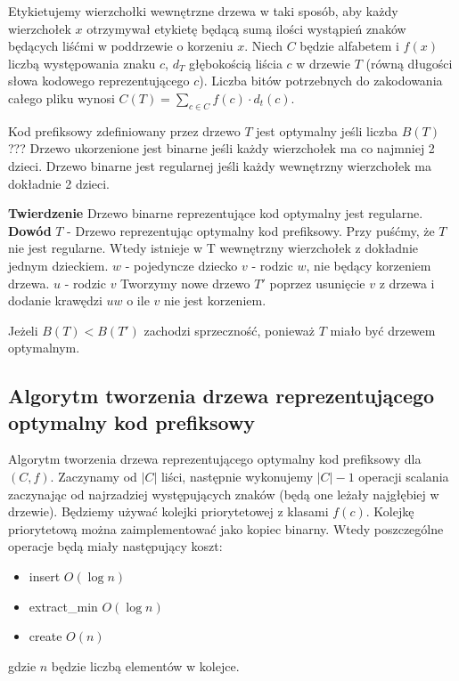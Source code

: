 
Etykietujemy wierzchołki wewnętrzne drzewa w taki sposób, aby każdy wierzchołek $x$ otrzymywał etykietę będącą sumą ilości wystąpień znaków będących liśćmi w poddrzewie o korzeniu $x$. Niech $C$ będzie alfabetem i  $f(x)$ liczbą występowania znaku $c$, $d_T$ głębokością liścia $c$ w drzewie $T$ (równą długości słowa kodowego reprezentującego $c$). Liczba bitów potrzebnych do zakodowania całego pliku wynosi $C(T) = \sum_{c \in C} f(c) \cdot d_t(c)$. 

Kod prefiksowy zdefiniowany przez drzewo $T$ jest optymalny jeśli liczba $B(T)$ ???
Drzewo ukorzenione  jest binarne jeśli każdy wierzchołek ma co najmniej 2 dzieci.
Drzewo binarne jest regularnej jeśli każdy wewnętrzny wierzchołek ma dokładnie 2 dzieci.

\textbf{Twierdzenie} Drzewo binarne reprezentujące kod optymalny jest regularne.
\textbf{Dowód} $T$ - Drzewo reprezentując optymalny kod prefiksowy. Przy puśćmy, że $T$ nie jest regularne. Wtedy istnieje w T wewnętrzny wierzchołek z dokładnie jednym dzieckiem.
$w$ - pojedyncze dziecko
$v$ - rodzic $w$, nie będący korzeniem drzewa.
$u$ - rodzic $v$
Tworzymy nowe drzewo $T'$ poprzez usunięcie $v$ z drzewa i dodanie krawędzi $uw$ o ile $v$ nie jest korzeniem.

Jeżeli $B(T) < B(T')$ zachodzi sprzeczność, ponieważ $T$ miało być drzewem optymalnym.

\subsection{Algorytm tworzenia drzewa reprezentującego optymalny kod prefiksowy}
Algorytm tworzenia drzewa reprezentującego optymalny kod prefiksowy dla $(C,f)$. 
Zaczynamy od $|C|$ liści, następnie wykonujemy $|C|-1$ operacji scalania zaczynając od najrzadziej występujących znaków (będą one leżały najgłębiej w drzewie). Będziemy używać kolejki priorytetowej z klasami $f(c)$. Kolejkę priorytetową można zaimplementować jako kopiec binarny. Wtedy poszczególne operacje będą miały następujący koszt:
\begin{itemize}
\item insert $O(\log n)$ 
\item extract\_min $O(\log n)$
\item create $O(n)$
\end{itemize}
gdzie $n$ będzie liczbą elementów w kolejce.

